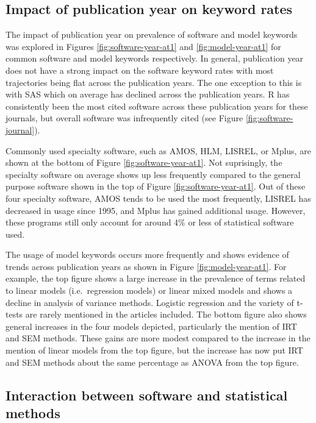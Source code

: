 \documentclass[english,,man]{apa6}
\theoremstyle{definition}
\theoremstyle{definition}
\theoremstyle{definition}
\theoremstyle{remark}
\begin{document}
\hypertarget{impact-of-publication-year-on-keyword-rates}{%
\subsection{Impact of publication year on keyword
rates}\label{impact-of-publication-year-on-keyword-rates}}

The impact of publication year on prevalence of software and model
keywords was explored in Figures \ref{fig:software-year-at1} and
\ref{fig:model-year-at1} for common software and model keywords
respectively. In general, publication year does not have a strong impact
on the software keyword rates with most trajectories being flat across
the publication years. The one exception to this is with SAS which on
average has declined across the publication years. R has consistently
been the most cited software across these publication years for these
journals, but overall software was infrequently cited (see Figure
\ref{fig:software-journal}).

Commonly used specialty software, such as AMOS, HLM, LISREL, or Mplus,
are shown at the bottom of Figure \ref{fig:software-year-at1}. Not
suprisingly, the specialty software on average shows up less frequently
compared to the general purpose software shown in the top of Figure
\ref{fig:software-year-at1}. Out of these four specialty software, AMOS
tends to be used the most frequently, LISREL has decreased in usage
since 1995, and Mplus has gained additional usage. However, these
programs still only account for around 4\% or less of statistical
software used.

The usage of model keywords occurs more frequently and shows evidence of
trends across publication years as shown in Figure
\ref{fig:model-year-at1}. For example, the top figure shows a large
increase in the prevalence of terms related to linear models
(i.e.~regression models) or linear mixed models and shows a decline in
analysis of variance methods. Logistic regression and the variety of
t-tests are rarely mentioned in the articles included. The bottom figure
also shows general increases in the four models depicted, particularly
the mention of IRT and SEM methods. These gains are more modest compared
to the increase in the mention of linear models from the top figure, but
the increase has now put IRT and SEM methods about the same percentage
as ANOVA from the top figure.

\hypertarget{interaction-between-software-and-statistical-methods}{%
\subsection{Interaction between software and statistical
methods}\label{interaction-between-software-and-statistical-methods}}
\end{document}

